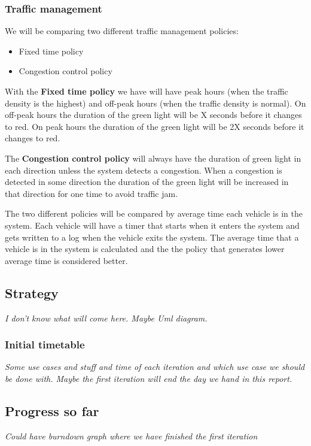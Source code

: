 \documentclass[11pt]{article}
\begin{document}
\subsubsection{Traffic management}
We will be comparing two different traffic management policies:
\begin{itemize}
\item Fixed time policy
\item Congestion control policy
\end{itemize}
\begin{description}
\item With the \textbf{Fixed time policy} we have will have peak hours (when the traffic density is the highest) and off-peak hours (when the traffic density is normal). On off-peak hours the duration of the green light will be X seconds before it changes to red. On peak hours the duration of the green light will be 2X seconds before it changes to red.
\item The \textbf{Congestion control policy} will always have the duration of green light in each direction unless the system detects a congestion. When a congestion is detected in some direction the duration of the green light will be increased in that direction for one time to avoid traffic jam.
\end{description}

The two different policies will be compared by average time each vehicle is in the system. Each vehicle will have a timer that starts when it enters the system and gets written to a log when the vehicle exits the system. The average time that a vehicle is in the system is calculated and the the policy that generates lower average time is considered better.

\subsection{Strategy}
\textit{I don't know what will come here. Maybe Uml diagram.}
\subsubsection{Initial timetable}
\textit{Some use cases and stuff and time of each iteration and which use case we should be done with. Maybe the first iteration will end the day we hand in this report.}
\subsection{Progress so far}
\textit{Could have burndown graph where we have finished the first iteration}
\end{document}
